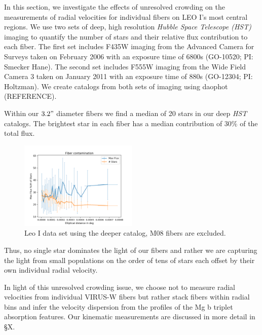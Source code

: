 \documentclass[%
 aip,
 twocolumn,
 jmp,%
 amsmath,amssymb,
 reprint,%
]{aastex61}
\begin{document}
In this section, we investigate the effects of unresolved crowding on the measurements of radial velocities for individual fibers on LEO I's most central regions.  We use two sets of deep, high resolution {\it Hubble Space Telescope (HST)} imaging to quantify the 
number of stars and their relative flux contribution to each fiber. The 
first set includes F435W imaging from the Advanced Camera for Surveys taken on 
February 2006 with an exposure time of 6800s (GO-10520; PI: Smecker Hane).
The second set includes F555W imaging from the Wide Field Camera 3 taken 
on January 2011 with an exposure time of 880s (GO-12304; PI: Holtzman).  
We create catalogs from both sets of imaging using daophot (REFERENCE).

Within our $3.2"$ diameter fibers we find a median of 20 stars in our deep
{\it HST} catalogs.  The brightest star in each fiber has a median
contribution of $30\%$ of the total flux. 

\begin{figure}
\centering
\includegraphics[width=0.5\textwidth]{CROWDING/fibercontamination.png}
\caption{Leo I data set using the deeper catalog, M08 fibers are excluded.}       
\end{figure}

Thus, no single star dominates the 
light of our fibers and rather we are capturing the light from small 
populations on the order of tens of stars each offset by their own individual
radial velocity. 

In light of this unresolved crowding issue, we choose not
to measure radial velocities from individual VIRUS-W fibers but rather stack fibers
within radial bins and infer the velocity dispersion from the profiles of the
Mg b triplet absorption features.  Our kinematic measurements are discussed 
in more detail in \S X.
\end{document}
